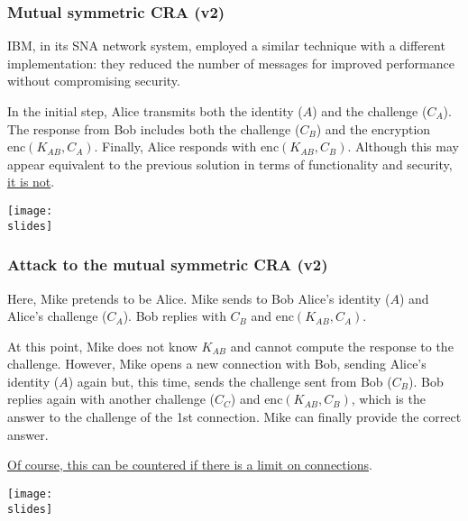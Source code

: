 \subsubsection{Mutual symmetric CRA (v2)}
\vspace*{5mm}
\noindent
\begin{minipage}{0.4\textwidth}
  IBM, in its SNA network system, employed a similar technique with a different implementation: they reduced the number of messages for improved performance without compromising security.

  In the initial step, Alice transmits both the identity (\(A\)) and the challenge (\(C_A\)). The response from Bob includes both the challenge (\(C_B\)) and the encryption \(\text{enc}(K_{AB}, C_A)\). Finally, Alice responds with \(\text{enc}(K_{AB}, C_B)\). Although this may appear equivalent to the previous solution in terms of functionality and security, \underline{it is not}.

\end{minipage}
\hspace{0.05\textwidth}
\begin{minipage}{0.5\textwidth}
  \centering
  \texttt{[image: \\slides]}
\end{minipage}




\subsubsection*{Attack to the mutual symmetric CRA (v2)}
\vspace*{5mm}
\noindent
\begin{minipage}{0.4\textwidth}
  Here, Mike pretends to be Alice. Mike sends to Bob Alice's identity (\(A\)) and Alice's challenge (\(C_A\)). Bob replies with \(C_B\) and \(\text{enc}(K_{AB}, C_A)\).

  At this point, Mike does not know \(K_{AB}\) and cannot compute the response to the challenge. However, Mike opens a new connection with Bob, sending Alice's identity (\(A\)) again but, this time, sends the challenge sent from Bob (\(C_B\)). Bob replies again with another challenge (\(C_C\)) and \(\text{enc}(K_{AB}, C_B)\), which is the answer to the challenge of the 1st connection. Mike can finally provide the correct answer.

  \ul{Of course, this can be countered if there is a limit on connections}.
\end{minipage}
\hspace{0.05\textwidth}
\begin{minipage}{0.5\textwidth}
  \centering
  \texttt{[image: \\slides]}
\end{minipage}

